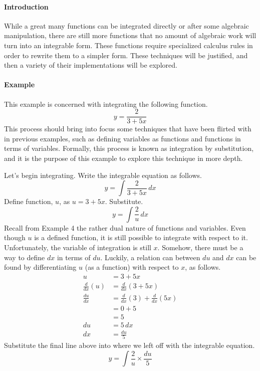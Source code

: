\documentclass{article}
\newcounter{example}%
\newcommand{\ex}{\stepcounter{example} \paragraph{Example \theexample}}
\begin{document}
\paragraph{Introduction} While a great many functions can be integrated directly or after some algebraic manipulation, there are still more functions that no amount of algebraic work will turn into an integrable form. These functions require specialized calculus rules in order to rewrite them to a simpler form. These techniques will be justified, and then a variety of their implementations will be explored.
\ex This example is concerned with integrating the following function.$$y=\frac{2}{3+5x}$$This process should bring into focus some techniques that have been flirted with in previous examples, such as defining variables as functions and functions in terms of variables. Formally, this process is known as integration by substitution, and it is the purpose of this example to explore this technique in more depth.\par
Let's begin integrating. Write the integrable equation as follows.
\begin{equation*}
    y=\int \frac{2}{3+5x}\, dx
\end{equation*}
Define function, $u$, as $u=3+5x$. Substitute.
\begin{equation*}
    y=\int \frac{2}{u}\, dx
\end{equation*}
Recall from Example 4 the rather dual nature of functions and variables. Even though $u$ is a defined function, it is still possible to integrate with respect to it. Unfortunately, the variable of integration is still $x$. Somehow, there must be a way to define $dx$ in terms of $du$. Luckily, a relation can between $du$ and $dx$ can be found by differentiating $u$ (as a function) with respect to $x$, as follows.
\begin{align*}
    u &= 3+5x\\
    \frac{d}{dx}(u) &= \frac{d}{dx}(3+5x)\\
    \frac{du}{dx} &= \frac{d}{dx}(3)+\frac{d}{dx}(5x)\\
    &= 0+5\\
    &= 5\\
    du &= 5\, dx\\
    dx &= \frac{du}{5}
\end{align*}
Substitute the final line above into where we left off with the integrable equation.
\begin{equation*}
    y=\int \frac{2}{u}\times \frac{du}{5}
\end{equation*}
\end{document}
